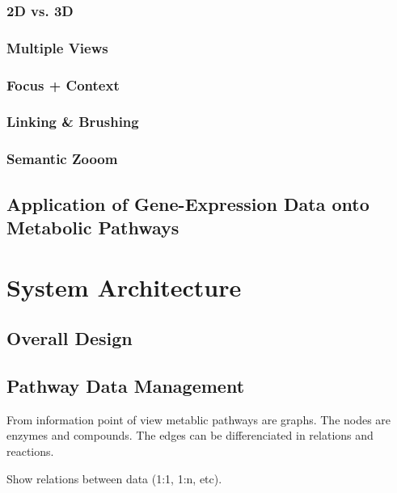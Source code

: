 \subsection{2D vs. 3D}

\subsection{Multiple Views}
\subsection{Focus + Context}
\subsection{Linking \& Brushing}
\subsection{Semantic Zooom}

\section{Application of Gene-Expression Data onto Metabolic Pathways}




\chapter{System Architecture}

\section{Overall Design}
\section{Pathway Data Management}

From information point of view metablic pathways are graphs. The nodes are enzymes and compounds. The edges can be differenciated in relations and reactions.


Show relations between data (1:1, 1:n, etc).

